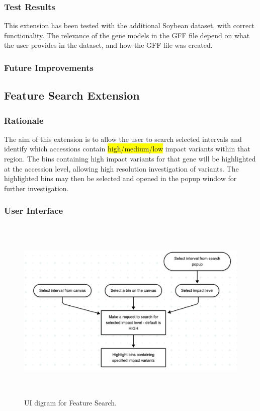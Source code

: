 \documentclass[12pt]{article}
\begin{document}
\subsubsection{Test Results}
This extension has been tested with the additional Soybean dataset, with correct functionality. The relevance of the gene models in the GFF file depend on what the user provides in the dataset, and how the GFF file was created. 

\subsubsection{Future Improvements}

\subsection{Feature Search Extension}
\subsubsection{Rationale}
The aim of this extension is to allow the user to search selected intervals and identify which accessions contain \hl{high/medium/low} impact variants within that region. The bins containing high impact variants for that gene will be highlighted at the accession level, allowing high resolution investigation of variants. The highlighted bins may then be selected and opened in the popup  window for further investigation.

\subsubsection{User Interface}
\begin{figure}[h]
    \centering
    \includegraphics[width=15cm, height=9cm]{FS1.png}
    \caption{UI digram for Feature Search.}
\end{figure}
\end{document}
